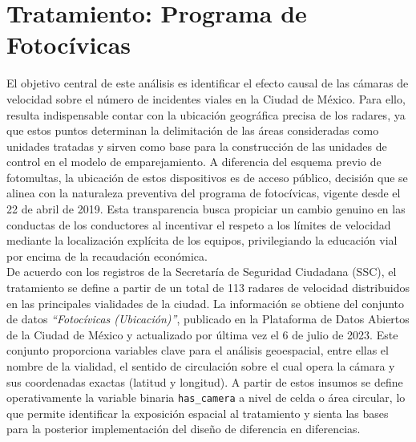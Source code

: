 \section{Tratamiento: Programa de Fotoc\'ivicas}
El objetivo central de este análisis es identificar el efecto causal de las cámaras de velocidad sobre el número de incidentes viales en la Ciudad de México. Para ello, resulta indispensable contar con la ubicación geográfica precisa de los radares, ya que estos puntos determinan la delimitación de las áreas consideradas como unidades tratadas y sirven como base para la construcción de las unidades de control en el modelo de emparejamiento. A diferencia del esquema previo de fotomultas, la ubicación de estos dispositivos es de acceso público, decisión que se alinea con la naturaleza preventiva del programa de fotocívicas, vigente desde el 22 de abril de 2019. Esta transparencia busca propiciar un cambio genuino en las conductas de los conductores al incentivar el respeto a los límites de velocidad mediante la localización explícita de los equipos, privilegiando la educación vial por encima de la recaudación económica.\\

De acuerdo con los registros de la Secretaría de Seguridad Ciudadana (SSC), el tratamiento se define a partir de un total de 113 radares de velocidad distribuidos en las principales vialidades de la ciudad. La información se obtiene del conjunto de datos \textit{``Fotoc\'ivicas (Ubicación)''}, publicado en la Plataforma de Datos Abiertos de la Ciudad de México y actualizado por última vez el 6 de julio de 2023. Este conjunto proporciona variables clave para el análisis geoespacial, entre ellas el nombre de la vialidad, el sentido de circulación sobre el cual opera la cámara y sus coordenadas exactas (latitud y longitud). A partir de estos insumos se define operativamente la variable binaria \texttt{has\_camera} a nivel de celda o área circular, lo que permite identificar la exposición espacial al tratamiento y sienta las bases para la posterior implementación del diseño de diferencia en diferencias.


